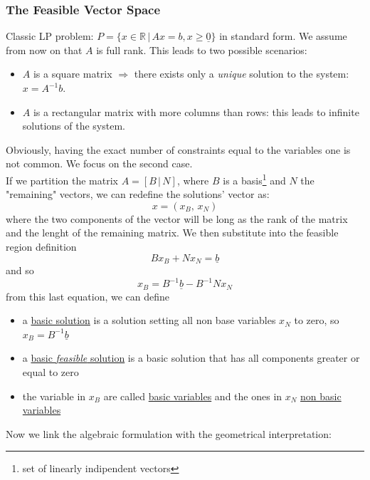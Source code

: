        \subsubsection{The Feasible Vector Space}
            Classic LP problem: $P=\{x \in \mathbb{R} \,\vert\, Ax = b, x \geq \underline{0}\}$ in standard form. We assume from now on that $A$ is full rank. This leads to two possible scenarios:
            \begin{itemize}
                \item $A$ is a square matrix $\Rightarrow$ there exists only a \textit{unique} solution to the system: $x = A^{-1}b$.
                \item $A$ is a rectangular matrix with more columns than rows: this leads to infinite solutions of the system.
            \end{itemize}
            Obviously, having the exact number of constraints equal to the variables one is not common. We focus on the second case.\\
            If we partition the matrix $A = [B \,\vert\, N]$, where $B$ is a basis\footnote{set of linearly indipendent vectors} and $N$ the "remaining" vectors, we can redefine the solutions' vector as:
            \begin{equation}
                x = (x_B,\, x_N)
            \end{equation}
            where the two components of the vector will be long as the rank of the matrix and the lenght of the remaining matrix. We then substitute into the feasible region definition
            \begin{equation}
                Bx_{B} + Nx_{N} = \underline{b}
            \end{equation}
            and so
            \begin{equation}
                x_{B} = B^{-1}\underline{b} - B^{-1}Nx_{N}
            \end{equation}
            from this last equation, we can define
            \begin{itemize}
                \item a \underline{basic solution} is a solution setting all non base variables $x_{N}$ to zero, so $x_B = B^{-1}\underline{b}$
                \item a \underline{basic \textit{feasible} solution} is a basic solution that has all components greater or equal to zero
                \item the variable in $x_B$ are called \underline{basic variables} and the ones in $x_N$ \underline{non basic variables}
            \end{itemize}
            Now we link the algebraic formulation with the geometrical interpretation:
            
